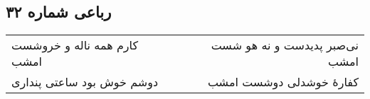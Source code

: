 \begin{center}
\section*{رباعی شماره ۳۲}
\label{sec:sh032}
\begin{longtable}{l p{0.5cm} r}
کارم همه ناله و خروشست امشب
&&
نی‌صبر پدیدست و نه هو شست امشب
\\
دوشم خوش بود ساعتی پنداری
&&
کفارهٔ خوشدلی دوشست امشب
\\
\end{longtable}
\end{center}
